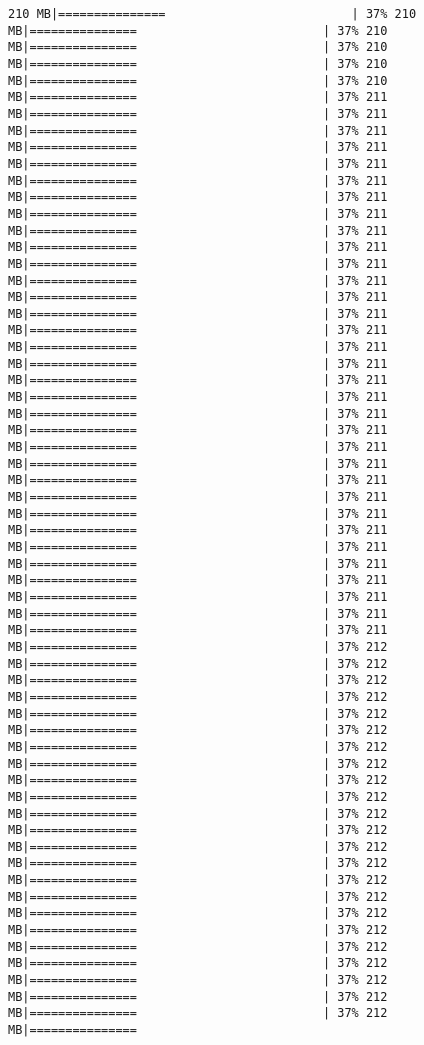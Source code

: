 \documentclass[
]{article}
\begin{document}
\begin{verbatim}
210 MB|===============                          | 37% 210 MB|===============                          | 37% 210 MB|===============                          | 37% 210 MB|===============                          | 37% 210 MB|===============                          | 37% 210 MB|===============                          | 37% 211 MB|===============                          | 37% 211 MB|===============                          | 37% 211 MB|===============                          | 37% 211 MB|===============                          | 37% 211 MB|===============                          | 37% 211 MB|===============                          | 37% 211 MB|===============                          | 37% 211 MB|===============                          | 37% 211 MB|===============                          | 37% 211 MB|===============                          | 37% 211 MB|===============                          | 37% 211 MB|===============                          | 37% 211 MB|===============                          | 37% 211 MB|===============                          | 37% 211 MB|===============                          | 37% 211 MB|===============                          | 37% 211 MB|===============                          | 37% 211 MB|===============                          | 37% 211 MB|===============                          | 37% 211 MB|===============                          | 37% 211 MB|===============                          | 37% 211 MB|===============                          | 37% 211 MB|===============                          | 37% 211 MB|===============                          | 37% 211 MB|===============                          | 37% 211 MB|===============                          | 37% 211 MB|===============                          | 37% 211 MB|===============                          | 37% 211 MB|===============                          | 37% 211 MB|===============                          | 37% 211 MB|===============                          | 37% 211 MB|===============                          | 37% 211 MB|===============                          | 37% 212 MB|===============                          | 37% 212 MB|===============                          | 37% 212 MB|===============                          | 37% 212 MB|===============                          | 37% 212 MB|===============                          | 37% 212 MB|===============                          | 37% 212 MB|===============                          | 37% 212 MB|===============                          | 37% 212 MB|===============                          | 37% 212 MB|===============                          | 37% 212 MB|===============                          | 37% 212 MB|===============                          | 37% 212 MB|===============                          | 37% 212 MB|===============                          | 37% 212 MB|===============                          | 37% 212 MB|===============                          | 37% 212 MB|===============                          | 37% 212 MB|===============                          | 37% 212 MB|===============                          | 37% 212 MB|===============                          | 37% 212 MB|===============                          | 37% 212 MB|===============                          | 37% 212 MB|===============   
\end{verbatim}
\end{document}
